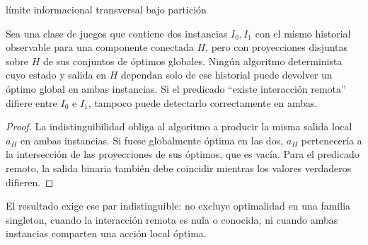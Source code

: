 \begin{contribucion}{límite informacional transversal bajo partición}
\begin{proposicion}
\label{prop:pre-cross-partition-limit}
Sea una clase de juegos que contiene dos instancias $I_0,I_1$ con el mismo historial observable para una componente conectada $H$, pero con proyecciones disjuntas sobre $H$ de sus conjuntos de óptimos globales. Ningún algoritmo determinista cuyo estado y salida en $H$ dependan solo de ese historial puede devolver un óptimo global en ambas instancias. Si el predicado ``existe interacción remota'' difiere entre $I_0$ e $I_1$, tampoco puede detectarlo correctamente en ambas.
\end{proposicion}
\begin{proof}
La indistinguibilidad obliga al algoritmo a producir la misma salida local $a_H$ en ambas instancias. Si fuese globalmente óptima en las dos, $a_H$ pertenecería a la intersección de las proyecciones de sus óptimos, que es vacía. Para el predicado remoto, la salida binaria también debe coincidir mientras los valores verdaderos difieren.
\end{proof}
El resultado exige ese par indistinguible: no excluye optimalidad en una familia singleton, cuando la interacción remota es nula o conocida, ni cuando ambas instancias comparten una acción local óptima.
\end{contribucion}
